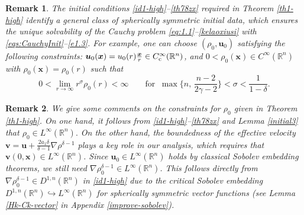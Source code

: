 \documentclass[11pt,reqno]{amsart}
\newtheorem{rk}{Remark}
\numberwithin{rk}{section}
\numberwithin{prop}{section}
\numberwithin{mydef}{section}
\numberwithin{lem}{section}
\numberwithin{equation}{section}
\numberwithin{thm}{section}
\begin{document}
\begin{rk}
The initial conditions \eqref{id1-high}--\eqref{th78zx} required  in {\rm Theorem \ref{th1-high}} identify a general class of spherically symmetric initial data, which ensures the unique solvability of the Cauchy problem \eqref{eq:1.1}--\eqref{kelaoxiusi} with \eqref{eqs:CauchyInit}--\eqref{e1.3}. For example, one can  choose $(\rho_0,\boldsymbol{u}_0)$ satisfying the following constraints{\rm:} 
$\boldsymbol{u}_0(\boldsymbol{x})=u_0(r)\frac{\boldsymbol{x}}{r} \in C_{\rm c}^\infty(\mathbb{R}^n)$, 
and $0<\rho_0(\boldsymbol{x})\in C^\infty(\mathbb{R}^n)$ 
with $\rho_0(\boldsymbol{x})=\rho_0(r)$ such that
\begin{equation*}
0<\lim_{r\to \infty}r^{\sigma}\rho_0(r)< \infty \qquad    
\text{for $\ \max\{n,\,\frac{n-2}{2\gamma-2}\}<\sigma<\frac{1}{1-\delta}$}.
\end{equation*}
\end{rk}



\begin{rk}\label{rk-nabla}
We give some comments on the  constraints for $\rho_0$ given 
in {\rm Theorem \ref{th1-high}}.
On one hand, it follows from \eqref{id1-high}--\eqref{th78zx} and {\rm Lemma \ref{initial3}} that $\rho_0\in L^\infty(\mathbb{R}^n).$
On the other hand, the boundedness of the effective velocity 
$\boldsymbol{v}=\boldsymbol{u}+\frac{2a_1\delta}{\delta-1} \nabla\rho^{\delta-1}$ plays a key role in our analysis, 
which requires that $\boldsymbol{v}(0,\boldsymbol{x})\in L^\infty(\mathbb{R}^n)$. 
Since $\boldsymbol{u}_0\in L^\infty(\mathbb{R}^n)$ holds by classical Sobolev embedding theorems, we still need 
$\nabla\rho_0^{\delta-1} \in L^\infty(\mathbb{R}^n)$. This follows directly from $\nabla \rho_0^{\delta-1}\in D^{1,n}(\mathbb{R}^n)$ in \eqref{id1-high} due to the critical Sobolev embedding $D^{1,n}(\mathbb{R}^n) \hookrightarrow L^{\infty}(\mathbb{R}^n)$ for spherically symmetric vector functions {\rm(}see {\rm Lemma \ref{Hk-Ck-vector}} 
in {\rm Appendix \ref{improve-sobolev}}{\rm)}.


\end{rk}
\end{document}
